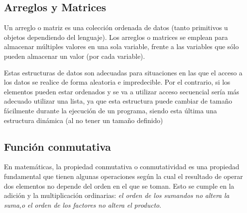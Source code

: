 \subsection{Arreglos y Matrices}
Un arreglo o matriz es una colección ordenada de datos (tanto primitivos u objetos dependiendo del lenguaje). Los arreglos o matrices se emplean para almacenar múltiples valores en una sola variable, frente a las variables que sólo pueden almacenar un valor (por cada variable).

Estas estructuras de datos son adecuadas para situaciones en las que el acceso a los datos se realice de forma aleatoria e impredecible. Por el contrario, si los elementos pueden estar ordenados y se va a utilizar acceso secuencial sería más adecuado utilizar una lista, ya que esta estructura puede cambiar de tamaño fácilmente durante la ejecución de un programa, siendo esta última una estructura dinámica (al no tener un tamaño definido)

\subsection{Función conmutativa}

En matemáticas, la propiedad conmutativa o conmutatividad es una propiedad fundamental que tienen algunas
operaciones según la cual el resultado de operar dos elementos no depende del orden en el que se toman.
Esto se cumple en la adición y la multiplicación ordinarias: \emph{el orden de los sumandos no altera la 
suma,o el orden de los factores no altera el producto}. 
